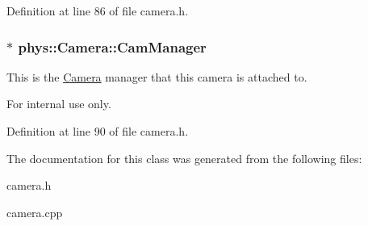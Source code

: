 Definition at line 86 of file camera.h.

\hypertarget{classphys_1_1Camera_a909203ede748deb1b587a8758ba8cec4}{
\subsubsection[{CamManager}]{$\ast$ {\bf phys::Camera::CamManager}}}
\label{d9/df8/classphys_1_1Camera_a909203ede748deb1b587a8758ba8cec4}


This is the \hyperlink{classphys_1_1Camera}{Camera} manager that this camera is attached to. 

\begin{DoxyInternal}{For internal use only.}
\end{DoxyInternal}


Definition at line 90 of file camera.h.



The documentation for this class was generated from the following files:\begin{DoxyCompactItemize}
\item 
camera.h\item 
camera.cpp\end{DoxyCompactItemize}
